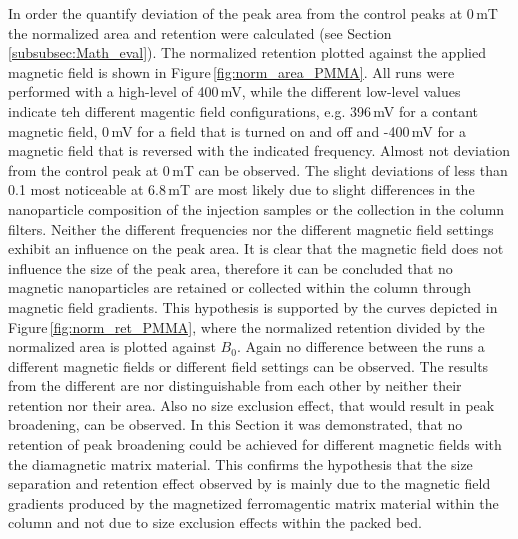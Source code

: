 In order the quantify deviation of the peak area from the control peaks at 0\,mT the normalized area and retention were calculated (see Section\,\ref{subsubsec:Math_eval}). The normalized retention plotted against the applied magnetic field is shown in Figure\,\ref{fig:norm_area_PMMA}. All runs were performed with a high-level of 400\,mV, while the different low-level values indicate teh different magentic field configurations, e.g. 396\,mV for a contant magnetic field, 0\,mV for a field that is turned on and off and -400\,mV for a magnetic field that is reversed with the indicated frequency. Almost not deviation from the control peak at 0\,mT can be observed. The slight deviations of less than 0.1 most noticeable at 6.8\,mT are most likely due to slight differences in the nanoparticle composition of the injection samples or the collection in the column filters. Neither the different frequencies nor the different magnetic field settings exhibit an influence on the peak area. It is clear that the magnetic field does not influence the size of the peak area, therefore it can be concluded that no magnetic nanoparticles are retained or collected within the column through magnetic field gradients. This hypothesis is supported by the curves depicted in Figure\,\ref{fig:norm_ret_PMMA}, where the normalized retention divided by the normalized area is plotted against $B_{0}$. Again no difference between the runs a different magnetic fields or different field settings can be observed. The results from the different are nor distinguishable from each other by neither their retention nor their area. Also no size exclusion effect, that would result in peak broadening, can be observed.\newline
In this Section it was demonstrated, that no retention of peak broadening could be achieved for different magnetic fields with the diamagnetic matrix material. This confirms the hypothesis that the size separation and retention effect observed by \cite{AndreMaster} is mainly due to the magnetic field gradients produced by the magnetized ferromagentic matrix material within the column and not due to size exclusion effects within the packed bed. 
 
  
  

